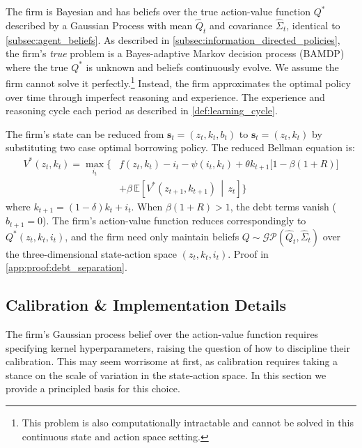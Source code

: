 The firm is Bayesian and has beliefs over the true action-value function $Q^*$ described by
a Gaussian Process with mean $\hat{Q}_t$ and covariance $\hat{\Sigma}_t$, identical to
\ref{subsec:agent_beliefs}. As described in \ref{subsec:information_directed_policies}, 
the firm's \textit{true} problem is a Bayes-adaptive Markov decision 
process (BAMDP) where the true $Q^*$ is unknown and beliefs continuously evolve. 
We assume the firm cannot solve it perfectly.\footnote{This problem
is also computationally intractable and cannot be solved in this continuous state and action space setting.}
Instead, the firm approximates the optimal policy over time through imperfect reasoning and experience.
The experience and reasoning cycle each period as described in \ref{def:learning_cycle}.

\begin{proposition}
\label{prop:debt_separation}
The firm's state can be reduced from $\mathbf{s}_t = (z_t, k_t, b_t)$ to $\mathbf{s}_t = (z_t, k_t)$ by 
substituting two case optimal borrowing policy. The reduced Bellman equation is:
\begin{equation}
\begin{split}
    V^*(z_t, k_t) = \max_{i_t} \Big\{ & f(z_t, k_t) - i_t - \psi(i_t, k_t) 
    + \theta k_{t+1}\bigl[1 - \beta(1+R)\bigr] \\
    & + \beta\, \mathbb{E}\!\left[ V^*(z_{t+1}, k_{t+1}) \,\middle|\, z_t \right] \Big\}
\end{split}
\end{equation}
where $k_{t+1} = (1-\delta)k_t + i_t$. When $\beta(1+R) > 1$, the debt terms 
vanish ($b_{t+1} = 0$). The firm's action-value function reduces correspondingly 
to $Q^*(z_t, k_t, i_t)$, and the firm need only maintain beliefs 
$Q \sim \mathcal{GP}(\hat{Q}_t, \hat{\Sigma}_t)$ over the three-dimensional 
state-action space $(z_t, k_t, i_t)$. Proof in \ref{app:proof:debt_separation}.
\end{proposition}


\subsection{Calibration \& Implementation Details} \label{subsec:investment_calibration}

The firm's Gaussian process belief over the action-value function requires specifying 
kernel hyperparameters, raising the question of how to discipline their calibration. 
This may seem worrisome at first, as calibration requires taking a stance on the scale 
of variation in the state-action space. In this section we provide a principled basis 
for this choice.

